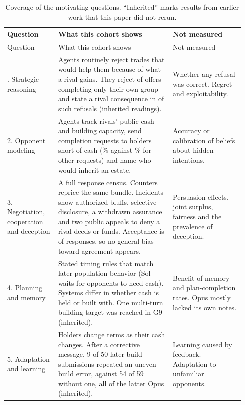 \begingroup\footnotesize
\renewcommand{\arraystretch}{1.12}
\begin{longtable}{@{}L{0.20\linewidth}L{0.45\linewidth}L{0.29\linewidth}@{}}
\caption{Coverage of the motivating questions. ``Inherited'' marks results from earlier work that this paper did not rerun.}\label{tab:questions}\\
\toprule
Question & What this cohort shows & Not measured\\
\midrule\endfirsthead
\toprule
Question & What this cohort shows & Not measured\\
\midrule\endhead
\bottomrule{}. Strategic reasoning & Agents routinely reject trades that would help them because of what a rival gains. They reject  of  offers completing only their own group and state a rival consequence in  of  such refusals (inherited readings). & Whether any refusal was correct. Regret and exploitability.\\
2. Opponent modeling & Agents track rivals' public cash and building capacity, send completion requests to holders short of cash (\% against \% for other requests) and name who would inherit an estate. & Accuracy or calibration of beliefs about hidden intentions.\\
3. Negotiation, cooperation and deception & A full response census. Counters reprice the same bundle. Incidents show authorized bluffs, selective disclosure, a withdrawn assurance and two public appeals to deny a rival deeds or funds. Acceptance is  of  responses, so no general bias toward agreement appears. & Persuasion effects, joint surplus, fairness and the prevalence of deception.\\
4. Planning and memory & Stated timing rules that match later population behavior (Sol waits for opponents to need cash). Systems differ in whether cash is held or built with. One multi-turn building target was reached in G9 (inherited). & Benefit of memory and plan-completion rates. Opus mostly lacked its own notes.\\
5. Adaptation and learning & Holders change terms as their cash changes. After a corrective message, 9 of 50 later build submissions repeated an uneven-build error, against 54 of 59 without one, all of the latter Opus (inherited). & Learning caused by feedback. Adaptation to unfamiliar opponents.\\

\end{longtable}
